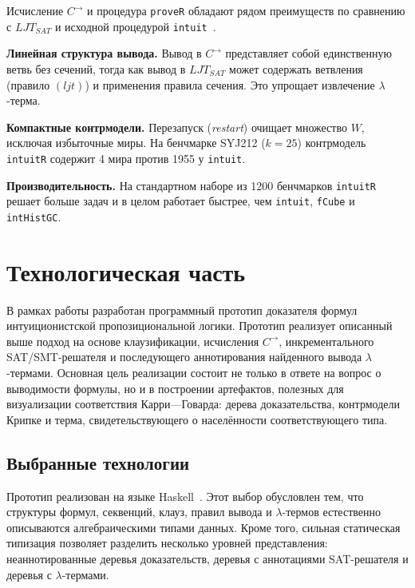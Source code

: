 \documentclass[14pt, russian]{scrartcl}
\begin{document}
Исчисление $C^{\rightarrow}$ и процедура \texttt{proveR} обладают рядом
преимуществ по сравнению с $LJT_{SAT}$ и исходной процедурой
\texttt{intuit}~\cite{ClaessenRosen2015}.

\textbf{Линейная структура вывода.} Вывод в $C^{\rightarrow}$
представляет собой единственную ветвь без сечений, тогда как вывод в
$LJT_{SAT}$ может содержать ветвления (правило $(ljt)$) и применения правила
сечения. Это упрощает извлечение $\lambda$-терма.

\textbf{Компактные контрмодели.} Перезапуск (\emph{restart}) очищает
множество $W$, исключая избыточные миры. На бенчмарке SYJ212 ($k = 25$)
контрмодель \texttt{intuitR} содержит 4 мира против 1955 у \texttt{intuit}.

\textbf{Производительность.} На стандартном наборе из 1200 бенчмарков
\texttt{intuitR} решает больше задач и в целом работает быстрее, чем
\texttt{intuit}, \texttt{fCube} и \texttt{intHistGC}.

\section{Технологическая часть}

В рамках работы разработан программный прототип доказателя формул
интуиционистской пропозициональной логики. Прототип реализует описанный выше
подход на основе клаузификации, исчисления $C^{\rightarrow}$, инкрементального
SAT/SMT-решателя и последующего аннотирования найденного вывода
$\lambda$-термами. Основная цель реализации состоит не только в ответе на
вопрос о выводимости формулы, но и в построении артефактов, полезных для
визуализации соответствия Карри---Говарда: дерева доказательства, контрмодели
Крипке и терма, свидетельствующего о населённости соответствующего типа.

\subsection{Выбранные технологии}

Прототип реализован на языке Haskell~\cite{HaskellReport2010,GHCUserGuide}. Этот
выбор обусловлен тем, что структуры формул, секвенций, клауз, правил вывода и
$\lambda$-термов естественно описываются алгебраическими типами данных. Кроме
того, сильная статическая типизация позволяет разделить несколько уровней
представления: неаннотированные деревья доказательств, деревья с аннотациями
SAT-решателя и деревья с $\lambda$-термами.
\end{document}
